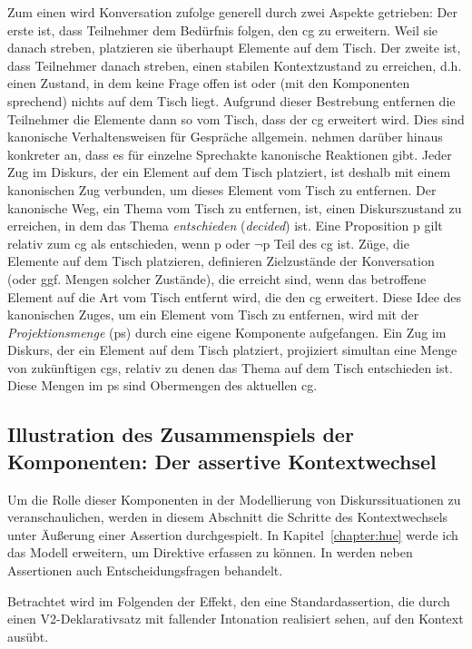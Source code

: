 Zum einen wird Konversation \citeauthor{Farkas2010} zufolge generell durch zwei Aspekte getrieben: Der erste ist, dass Teilnehmer dem Bedürfnis folgen, den cg zu erweitern. Weil sie danach streben, platzieren sie überhaupt Elemente auf dem Tisch. Der zweite ist, dass Teilnehmer danach streben, einen stabilen Kontextzustand zu erreichen, d.h. einen Zustand, in dem keine Frage offen ist oder (mit den Komponenten sprechend) nichts auf dem Tisch liegt. Aufgrund dieser Bestrebung entfernen die Teilnehmer die Elemente dann so vom Tisch, dass der cg erweitert wird. Dies sind kanonische Verhaltensweisen für Gespräche allgemein. \citet{Farkas2010} nehmen darüber hinaus konkreter an, dass es für einzelne Sprechakte kanonische Reaktionen gibt. Jeder Zug im Diskurs, der ein Element auf dem Tisch platziert, ist deshalb mit einem kanonischen Zug verbunden, um dieses  Element vom Tisch zu entfernen. Der kanonische Weg, ein Thema vom Tisch zu entfernen, ist, einen Diskurszustand zu erreichen, in dem das Thema \textit{entschieden} (\textit{decided})  ist. Eine Proposition p gilt relativ zum cg als entschieden, wenn p oder $\neg$p Teil des cg ist.  Züge, die Elemente auf dem Tisch platzieren, definieren Zielzustände der Konversation (oder ggf. Mengen solcher Zustände), die erreicht sind, wenn das betroffene Element auf die Art vom Tisch entfernt wird, die den cg erweitert. Diese Idee des kanonischen Zuges, um ein Element vom Tisch zu entfernen, wird mit der \textit{Projektionsmenge} (ps)  durch eine eigene Komponente aufgefangen. Ein Zug im Diskurs, der ein Element auf dem Tisch platziert, projiziert simultan eine Menge von zukünftigen cgs, relativ zu denen das Thema auf dem Tisch entschieden ist. Diese Mengen im ps sind Obermengen des aktuellen cg. 

\subsection{Illustration des Zusammenspiels der Komponenten: Der assertive Kontextwechsel}
Um die Rolle dieser Komponenten in der Modellierung von Diskurssituationen zu veranschaulichen, werden in diesem Abschnitt die Schritte des Kontextwechsels unter Äußerung einer Assertion  durchgespielt. In Kapitel~\ref{chapter:hue} werde ich das Mo\-dell erweitern, um Direktive erfassen zu können. In \citet{Farkas2010} werden neben Assertionen auch Entscheidungsfragen behandelt.

Betrachtet wird im Folgenden der Effekt, den eine Standardassertion, die \citet{Farkas2010} durch einen V2-Deklarativsatz mit fallender Intonation realisiert sehen, auf den Kontext ausübt. 

